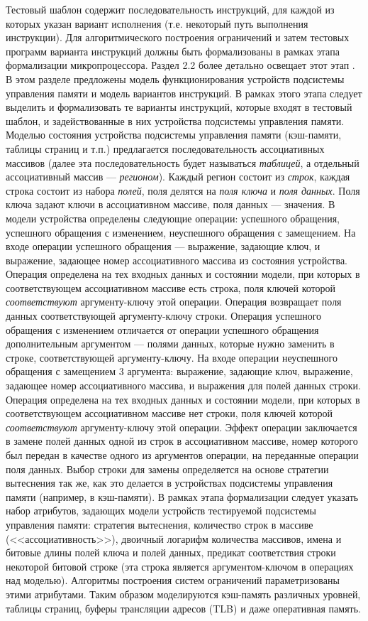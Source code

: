 \documentclass[14pt,autoref,href
,facsimile
]{disser}
\begin{document}
Тестовый шаблон содержит последовательность инструкций, для каждой из которых указан вариант исполнения (т.е. некоторый путь выполнения инструкции). Для алгоритмического построения ограничений и затем тестовых программ варианта инструкций должны быть формализованы в рамках этапа формализации микропроцессора. Раздел 2.2 более детально освещает этот этап . В этом разделе предложены модель функционирования устройств подсистемы управления памяти и модель вариантов инструкций. В рамках этого этапа следует выделить и формализовать те варианты инструкций, которые входят в тестовый шаблон, и задействованные в них устройства подсистемы управления памяти. Моделью состояния устройства подсистемы управления памяти (кэш-памяти, таблицы страниц и т.п.) предлагается последовательность ассоциативных массивов (далее эта последовательность будет называться \emph{таблицей}, а отдельный ассоциативный массив --- \emph{регионом}). Каждый регион состоит из \emph{строк}, каждая строка состоит из набора \emph{полей}, поля делятся на \emph{поля ключа} и \emph{поля данных}. Поля ключа задают ключи в ассоциативном массиве, поля данных --- значения. В модели устройства определены следующие операции: успешного обращения, успешного обращения с изменением, неуспешного обращения с замещением. На входе операции успешного обращения --- выражение, задающие ключ, и выражение, задающее номер ассоциативного массива из состояния устройства. Операция определена на тех входных данных и состоянии модели, при которых в соответствующем ассоциативном массиве есть строка, поля ключей которой \emph{соответствуют} аргументу-ключу этой операции. Операция возвращает поля данных соответствующей аргументу-ключу строки. Операция успешного обращения с изменением отличается от операции успешного обращения дополнительным аргументом --- полями данных, которые нужно заменить в строке, соответствующей аргументу-ключу. На входе операции  неуспешного обращения с замещением 3 аргумента: выражение, задающие ключ, выражение, задающее номер ассоциативного массива, и выражения для полей данных строки. Операция определена на тех входных данных и состоянии модели, при которых в соответствующем ассоциативном массиве нет строки, поля ключей которой \emph{соответствуют} аргументу-ключу этой операции. Эффект операции заключается в замене полей данных одной из строк в ассоциативном массиве, номер которого был передан в качестве одного из аргументов операции, на переданные операции поля данных. Выбор строки для замены определяется на основе стратегии вытеснения так же, как это делается в устройствах подсистемы управления памяти (например, в кэш-памяти). В рамках этапа формализации следует указать набор атрибутов, задающих модели устройств тестируемой подсистемы управления памяти: стратегия вытеснения, количество строк в массиве (<<ассоциативность>>), двоичный логарифм количества массивов, имена и битовые длины полей ключа и полей данных, предикат соответствия строки некоторой битовой строке (эта строка является аргументом-ключом в операциях над моделью). Алгоритмы построения систем ограничений параметризованы этими атрибутами. Таким образом моделируются кэш-память различных уровней, таблицы страниц, буферы трансляции адресов (TLB) и даже оперативная память.
\end{document}
